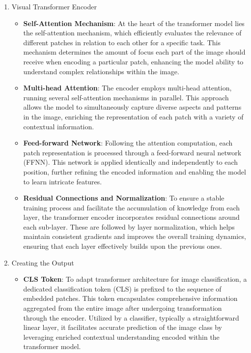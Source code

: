 \documentclass[12pt,a4paper]{report}
\begin{document}
\begin{enumerate}
  \item Visual Transformer Encoder
        \begin{itemize}
          \item \textbf{Self-Attention Mechanism}: At the heart of the transformer model lies the self-attention mechanism, which efficiently evaluates the relevance of different patches in relation to each other for a specific task. This mechanism determines the amount of focus each part of the image should receive when encoding a particular patch, enhancing the model ability to understand complex relationships within the image.
          \item \textbf{Multi-head Attention}: The encoder employs multi-head attention, running several self-attention mechanisms in parallel. This approach allows the model to simultaneously capture diverse aspects and patterns in the image, enriching the representation of each patch with a variety of contextual information.
          \item \textbf{Feed-forward Network}: Following the attention computation, each patch representation is processed through a feed-forward neural network (FFNN). This network is applied identically and independently to each position, further refining the encoded information and enabling the model to learn intricate features.
          \item \textbf{Residual Connections and Normalization}: To ensure a stable training process and facilitate the accumulation of knowledge from each layer, the transformer encoder incorporates residual connections around each sub-layer. These are followed by layer normalization, which helps maintain consistent gradients and improves the overall training dynamics, ensuring that each layer effectively builds upon the previous ones.
        \end{itemize}

  \item Creating the Output
        \begin{itemize}
          \item \textbf{CLS Token}: To adapt transformer architecture for image classification, a dedicated classification token (CLS) is prefixed to the sequence of embedded patches. This token encapsulates comprehensive information aggregated from the entire image after undergoing transformation through the encoder. Utilized by a classifier, typically a straightforward linear layer, it facilitates accurate prediction of the image class by leveraging enriched contextual understanding encoded within the transformer model.
        \end{itemize}


\end{enumerate}
\end{document}
